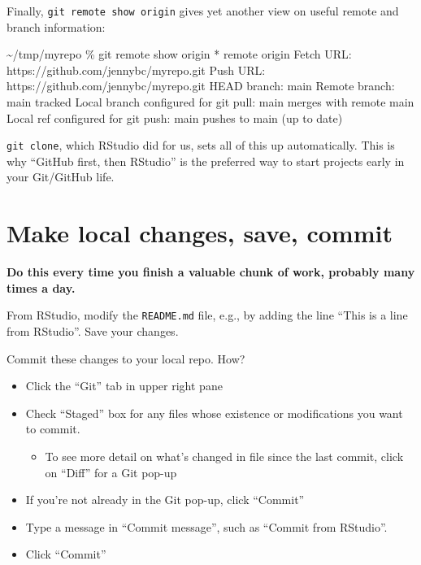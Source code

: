 \documentclass[
]{book}
\newenvironment{Shaded}{\begin{snugshade}}{\end{snugshade}}
\newcommand{\NormalTok}[1]{#1}
\providecommand{\tightlist}{%
  \setlength{\itemsep}{0pt}\setlength{\parskip}{0pt}}
\begin{document}
Finally, \texttt{git\ remote\ show\ origin} gives yet another view on useful remote and branch information:

\begin{Shaded}
\begin{Highlighting}[]
\NormalTok{\textasciitilde{}/tmp/myrepo \% git remote show origin    }
\NormalTok{* remote origin}
\NormalTok{  Fetch URL: https://github.com/jennybc/myrepo.git}
\NormalTok{  Push  URL: https://github.com/jennybc/myrepo.git}
\NormalTok{  HEAD branch: main}
\NormalTok{  Remote branch:}
\NormalTok{    main tracked}
\NormalTok{  Local branch configured for \textquotesingle{}git pull\textquotesingle{}:}
\NormalTok{    main merges with remote main}
\NormalTok{  Local ref configured for \textquotesingle{}git push\textquotesingle{}:}
\NormalTok{    main pushes to main (up to date)}
\end{Highlighting}
\end{Shaded}

\texttt{git\ clone}, which RStudio did for us, sets all of this up automatically.
This is why ``GitHub first, then RStudio'' is the preferred way to start projects early in your Git/GitHub life.

\section{Make local changes, save, commit}\label{make-local-changes-save-commit-1}

\textbf{Do this every time you finish a valuable chunk of work, probably many times a day.}

From RStudio, modify the \texttt{README.md} file, e.g., by adding the line ``This is a line from RStudio''.
Save your changes.

Commit these changes to your local repo. How?

\begin{itemize}
\tightlist
\item
  Click the ``Git'' tab in upper right pane
\item
  Check ``Staged'' box for any files whose existence or modifications you want to commit.

  \begin{itemize}
  \tightlist
  \item
    To see more detail on what's changed in file since the last commit, click on ``Diff'' for a Git pop-up
  \end{itemize}
\item
  If you're not already in the Git pop-up, click ``Commit''
\item
  Type a message in ``Commit message'', such as ``Commit from RStudio''.
\item
  Click ``Commit''
\end{itemize}
\end{document}
